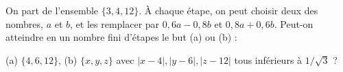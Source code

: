 On part de l'ensemble $\{3, 4, 12\}$. À chaque étape, on peut choisir deux des nombres, $a$ et $b$, et les remplacer par $0{,}6a - 0{,}8b$ et $0{,}8a + 0{,}6b$. Peut-on atteindre en un nombre fini d'étapes le but (a) ou (b) :

(a) $\{4, 6, 12\}$, (b) $\{x, y, z\}$ avec $|x - 4|, |y - 6|, |z - 12|$ tous inférieurs à $1/\sqrt{3}$ ?
